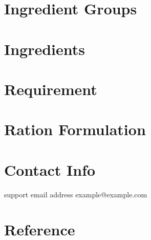 \documentclass[a4paper,12pt]{article}
\begin{document}
\newpage


\newpage


\section{Ingredient Groups}

\section{Ingredients}

\section{Requirement}

\section{Ration Formulation}


\newpage
\section{Contact Info}\label{sec:contact_info}

support email address example@example.com

\newpage
\section{Reference}
\printbibliography[title={References}]
\end{document}
